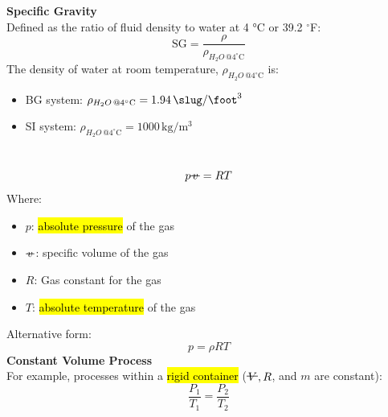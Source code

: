 ﻿\documentclass[12pt]{article}
\newcommand{\vol}{\mathord{\text{\ooalign{\hidewidth $V$\hidewidth\cr\kern-0.5pt\raisebox{0.8ex}{\rule[0pt]{1em}{0.5pt}}}}}}
\newcommand{\svol}{%
  \mathord{\text{\ooalign{%
    \hfil$v$\hfil\cr
    \hfil\rule[0.6ex]{0.8em}{0.5pt}\hfil
  }}}%
}
\begin{document}
\textbf{Specific Gravity}\\
Defined as the ratio of fluid density to water at 4 \unit{\celsius} or 39.2 $^\circ$F:
\[\text{SG} = \frac{\rho}{\rho_{H_2O\,@ 4^\circ \text{C}}}\]
The density of water at room temperature, $\rho_{H_2O\,@ 4^\circ \text{C}}$ is:
\begin{itemize}
    \item BG system: $\rho_{H_2O\,@ 4^\circ \text{C}} = 1.94\,\unit{\slug\per\cubic\foot}$
    \item SI system: $\rho_{H_2O\,@ 4^\circ \text{C}} = 1000\,\unit{\kilogram\per\cubic\meter}$
\end{itemize}
\begin{center}
\end{center}
\section*{}
\[p\svol = RT\]
Where:
\begin{itemize}
    \item $p$: \hl{absolute pressure} of the gas
    \item $\svol$: specific volume of the gas
    \item $R$: Gas constant for the gas
    \item $T$: \hl{absolute temperature} of the gas
\end{itemize}
Alternative form:
\[p = \rho RT\]
\textbf{Constant Volume Process}\\
For example, processes within a \hl{rigid container} ($\vol,R$, and $m$ are constant):
\[\frac{P_1}{T_1} = \frac{P_2}{T_2}\]
\end{document}
